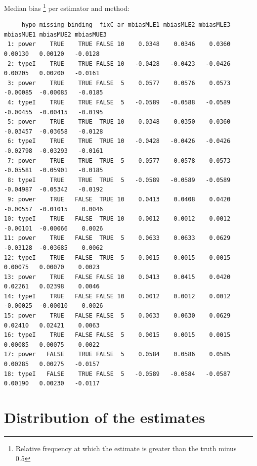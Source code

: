 \documentclass[12pt]{article}
\begin{document}
Median bias \footnote{Relative frequency at which the estimate is greater than the truth minus 0.5} per estimator and method:
\begin{adjustwidth}{-1cm}{-1cm}
\begin{verbatim}
     hypo missing binding  fixC ar mbiasMLE1 mbiasMLE2 mbiasMLE3 mbiasMUE1 mbiasMUE2 mbiasMUE3
 1: power    TRUE    TRUE FALSE 10    0.0348    0.0346    0.0360   0.00130   0.00120   -0.0128
 2: typeI    TRUE    TRUE FALSE 10   -0.0428   -0.0423   -0.0426   0.00205   0.00200   -0.0161
 3: power    TRUE    TRUE FALSE  5    0.0577    0.0576    0.0573  -0.00085  -0.00085   -0.0185
 4: typeI    TRUE    TRUE FALSE  5   -0.0589   -0.0588   -0.0589  -0.00455  -0.00415   -0.0195
 5: power    TRUE    TRUE  TRUE 10    0.0348    0.0350    0.0360  -0.03457  -0.03658   -0.0128
 6: typeI    TRUE    TRUE  TRUE 10   -0.0428   -0.0426   -0.0426  -0.02798  -0.03293   -0.0161
 7: power    TRUE    TRUE  TRUE  5    0.0577    0.0578    0.0573  -0.05581  -0.05901   -0.0185
 8: typeI    TRUE    TRUE  TRUE  5   -0.0589   -0.0589   -0.0589  -0.04987  -0.05342   -0.0192
 9: power    TRUE   FALSE  TRUE 10    0.0413    0.0408    0.0420  -0.00557  -0.01015    0.0046
10: typeI    TRUE   FALSE  TRUE 10    0.0012    0.0012    0.0012  -0.00101  -0.00066    0.0026
11: power    TRUE   FALSE  TRUE  5    0.0633    0.0633    0.0629  -0.03128  -0.03685    0.0062
12: typeI    TRUE   FALSE  TRUE  5    0.0015    0.0015    0.0015   0.00075   0.00070    0.0023
13: power    TRUE   FALSE FALSE 10    0.0413    0.0415    0.0420   0.02261   0.02398    0.0046
14: typeI    TRUE   FALSE FALSE 10    0.0012    0.0012    0.0012  -0.00025  -0.00010    0.0026
15: power    TRUE   FALSE FALSE  5    0.0633    0.0630    0.0629   0.02410   0.02421    0.0063
16: typeI    TRUE   FALSE FALSE  5    0.0015    0.0015    0.0015   0.00085   0.00075    0.0022
17: power   FALSE    TRUE FALSE  5    0.0584    0.0586    0.0585   0.00285   0.00275   -0.0157
18: typeI   FALSE    TRUE FALSE  5   -0.0589   -0.0584   -0.0587   0.00190   0.00230   -0.0117
\end{verbatim}

\end{adjustwidth}

\clearpage

\section{Distribution of the estimates}
\label{sec:orgb9b4e7e}
\end{document}
